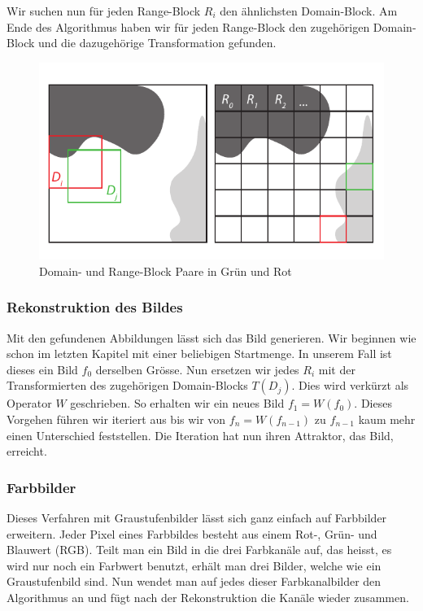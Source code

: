 Wir suchen nun für jeden Range-Block $R_i$ den ähnlichsten Domain-Block.
Am Ende des Algorithmus haben wir für jeden Range-Block den zugehörigen Domain-Block und die dazugehörige Transformation gefunden.

\begin{figure}	
	\centering
	\includegraphics[width=\textwidth]{papers/ifs/images/FIC}
	\caption{Domain- und Range-Block Paare in Grün und Rot}
	\label{ifs:FIC}
\end{figure}

\subsubsection{Rekonstruktion des Bildes}
%
Mit den gefundenen Abbildungen lässt sich das Bild generieren.
Wir beginnen wie schon im letzten Kapitel mit einer beliebigen Startmenge.
In unserem Fall ist dieses ein Bild  $f_0$ derselben Grösse.
Nun ersetzen wir jedes $R_i$ mit der Transformierten des zugehörigen Domain-Blocks $T(D_j)$.
Dies wird verkürzt als Operator $W$ geschrieben.
So erhalten wir ein neues Bild $f_1 = W(f_0)$.
Dieses Vorgehen führen wir iteriert aus bis wir von $f_n = W(f_{n-1})$ zu $f_{n-1}$ kaum mehr einen Unterschied feststellen. Die Iteration hat nun ihren Attraktor, das Bild, erreicht.

\subsubsection{Farbbilder}
%
Dieses Verfahren mit Graustufenbilder lässt sich ganz einfach auf Farbbilder erweitern.
Jeder Pixel eines Farbbildes besteht aus einem Rot-, Grün- und Blauwert (RGB).
%
%
%
%
Teilt man ein Bild in die drei Farbkanäle auf, das heisst, es wird nur noch ein Farbwert benutzt, erhält man drei Bilder, welche wie ein Graustufenbild sind.
%
Nun wendet man auf jedes dieser Farbkanalbilder den Algorithmus an und fügt nach der Rekonstruktion die Kanäle wieder zusammen. 


